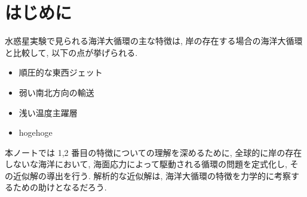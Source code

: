 \chapter{はじめに}

水惑星実験で見られる海洋大循環の主な特徴は, 
岸の存在する場合の海洋大循環と比較して, 以下の点が挙げられる. 
\begin{itemize}
\item 順圧的な東西ジェット
\item 弱い南北方向の輸送
\item 浅い温度主躍層
\item hogehoge
\end{itemize}
本ノートでは 1,2 番目の特徴についての理解を深めるために, 
全球的に岸の存在しないな海洋において, 海面応力によって駆動される循環の問題を定式化し, 
その近似解の導出を行う. 
解析的な近似解は, 海洋大循環の特徴を力学的に考察するための助けとなるだろう. 


